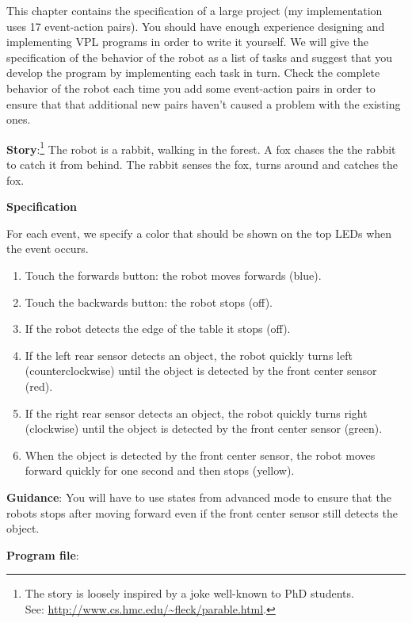 
\label{ch.rabbit}

This chapter contains the specification of a large project (my
implementation uses 17 event-action pairs). You should have enough
experience designing and implementing VPL programs in order to write it
yourself. We will give the specification of the behavior of the robot as
a list of tasks and suggest that you develop the program by implementing
each task in turn. Check the complete behavior of the robot each time
you add some event-action pairs in order to ensure that that additional
new pairs haven't caused a problem with the existing ones.


\textbf{Story}:\footnote{The story is loosely inspired by a joke
well-known to PhD students.\\ See:
\url{http://www.cs.hmc.edu/~fleck/parable.html}.} The robot is a rabbit,
walking in the forest. A fox chases the the rabbit to catch
it from behind. The rabbit senses the fox, turns around and catches the
fox.


\textbf{Specification}

For each event, we specify a color that should be shown on the top LEDs
when the event occurs.

\begin{enumerate}
\item Touch the forwards button: the robot moves forwards (blue).
\item Touch the backwards button: the robot stops (off).
\item If the robot detects the edge of the table it stops (off).
\item If the left rear sensor detects an object, the robot quickly turns
left (counterclockwise) until the object is detected by the front center
sensor (red).
\item If the right rear sensor detects an object, the robot quickly turns
right (clockwise) until the object is detected by the front center
sensor (green).
\item When the object is detected by the front center sensor, the robot
moves forward quickly for one second and then stops (yellow).
\end{enumerate}

\textbf{Guidance}: You will have to use states from advanced mode to
ensure that the robots stops after moving forward even if the front
center sensor still detects the object.

\bigskip

\textbf{Program file}: 
